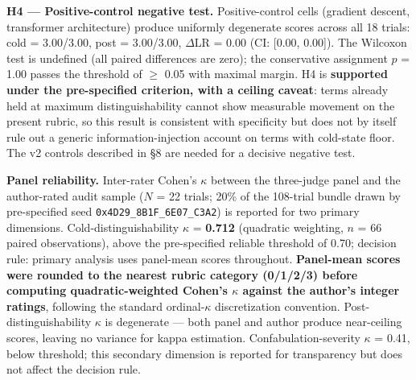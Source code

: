 \documentclass[11pt,a4paper]{article}
\begin{document}
\textbf{H4 --- Positive-control negative test.} Positive-control cells (gradient descent, transformer architecture) produce uniformly degenerate scores across all 18 trials: cold = 3.00/3.00, post = 3.00/3.00, $\Delta$LR = 0.00 (CI: [0.00, 0.00]). The Wilcoxon test is undefined (all paired differences are zero); the conservative assignment $p$ = 1.00 passes the threshold of $\geq$ 0.05 with maximal margin. H4 is \textbf{supported under the pre-specified criterion, with a ceiling caveat}: terms already held at maximum distinguishability cannot show measurable movement on the present rubric, so this result is consistent with specificity but does not by itself rule out a generic information-injection account on terms with cold-state floor. The v2 controls described in \S8 are needed for a decisive negative test.

\textbf{Panel reliability.} Inter-rater Cohen's $\kappa$ between the three-judge panel and the author-rated audit sample ($N$ = 22 trials; 20\% of the 108-trial bundle drawn by pre-specified seed \texttt{0x4D29\_8B1F\_6E07\_C3A2}) is reported for two primary dimensions. Cold-distinguishability $\kappa$ = \textbf{0.712} (quadratic weighting, $n$ = 66 paired observations), above the pre-specified reliable threshold of 0.70; decision rule: primary analysis uses panel-mean scores throughout. \textbf{Panel-mean scores were rounded to the nearest rubric category (0/1/2/3) before computing quadratic-weighted Cohen's $\kappa$ against the author's integer ratings}, following the standard ordinal-$\kappa$ discretization convention. Post-distinguishability $\kappa$ is degenerate --- both panel and author produce near-ceiling scores, leaving no variance for kappa estimation. Confabulation-severity $\kappa$ = 0.41, below threshold; this secondary dimension is reported for transparency but does not affect the decision rule.
\end{document}

